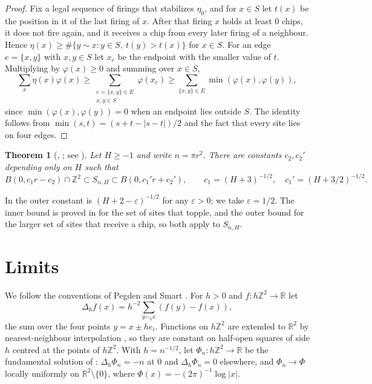 \documentclass[11pt]{amsart}
\newtheorem{theorem}{Theorem}[section]
\theoremstyle{remark}
\numberwithin{equation}{section}
\newcommand{\Z}{\mathbb Z}
\newcommand{\R}{\mathbb R}
\begin{document}
\begin{proof}
Fix a legal sequence of firings that stabilizes $\eta_0$, and for $x\in S$ let $t(x)$ be the position in it of the last firing of $x$. After that firing $x$ holds at least $0$ chips, it does not fire again, and it receives a chip from every later firing of a neighbour. Hence $\eta(x)\ge\#\{y\sim x:y\in S,\ t(y)>t(x)\}$ for $x\in S$. For an edge $e=\{x,y\}$ with $x,y\in S$ let $x_e$ be the endpoint with the smaller value of $t$. Multiplying by $\varphi(x)\ge0$ and summing over $x\in S$,
\[
\sum_x\eta(x)\varphi(x)\ge\sum_{\substack{e=\{x,y\}\in E\\x,y\in S}}\varphi(x_e)\ge\sum_{\{x,y\}\in E}\min(\varphi(x),\varphi(y)),
\]
since $\min(\varphi(x),\varphi(y))=0$ when an endpoint lies outside $S$. The identity follows from $\min(s,t)=(s+t-|s-t|)/2$ and the fact that every site lies on four edges.
\end{proof}

\begin{theorem}[{\cite[Theorem~4.1]{LP}, \cite[Section~3.1]{FLP}; see \cite[Theorem~6.3]{HLMPPW}}]\label{thm:lp}
Let $H\ge-1$ and write $n=\pi r^2$. There are constants $c_2,c_2'$ depending only on $H$ such that
\[
B(0,c_1r-c_2)\cap\Z^2\subset S_{n,H}\subset B(0,c_1'r+c_2'),\qquad c_1=(H+3)^{-1/2},\quad c_1'=(H+3/2)^{-1/2}.
\]
\end{theorem}

In \cite{LP} the outer constant is $(H+2-\varepsilon)^{-1/2}$ for any $\varepsilon>0$; we take $\varepsilon=1/2$. The inner bound is proved in \cite[Section~4]{LP} for the set of sites that topple, and the outer bound for the larger set of sites that receive a chip, so both apply to $S_{n,H}$.

\section{Limits}\label{sec:limits}

We follow the conventions of Pegden and Smart \cite[Section~2]{PS}. For $h>0$ and $f\colon h\Z^2\to\R$ let
\[
\Delta_hf(x)=h^{-2}\sum_{y\sim_hx}(f(y)-f(x)),
\]
the sum over the four points $y=x\pm he_i$. Functions on $h\Z^2$ are extended to $\R^2$ by nearest-neighbour interpolation \cite[Section~2.2]{PS}, so they are constant on half-open squares of side $h$ centred at the points of $h\Z^2$. With $h=n^{-1/2}$, let $\Phi_n\colon h\Z^2\to\R$ be the fundamental solution of \cite[Section~2.3]{PS}: $\Delta_h\Phi_n=-n$ at $0$ and $\Delta_h\Phi_n=0$ elsewhere, and $\Phi_n\to\Phi$ locally uniformly on $\R^2\setminus\{0\}$, where $\Phi(x)=-(2\pi)^{-1}\log|x|$.
\end{document}
